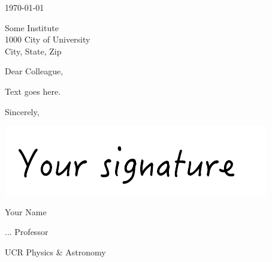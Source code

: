 \documentclass[12pt]{article}
\begin{document}
\afterpage{\aftergroup\restoregeometry}
\thispagestyle{firststyle} 	%
\pagestyle{empty}			%

\today \bigskip

\begin{singlespace}
Some Institute \\
1000 City of University \\
City, State, Zip \par
\end{singlespace}


\bigskip

Dear Colleague, \par \bigskip


Text goes here.

\vspace{2cm}
\hspace{.5\textwidth}
\begin{minipage}[]{5in}
Sincerely, \par \medskip

\includegraphics[height=3\baselineskip]{Signature.pdf} \par
Your Name \par
... Professor\par
UCR Physics \& Astronomy
\end{minipage}
\end{document}
